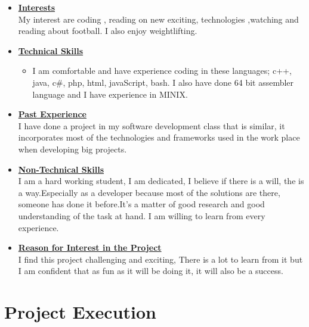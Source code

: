 \documentclass[a4paper,12pt]{article}
\begin{document}
\begin{itemize}
\item {\Large \underline{\textbf{Interests}}}\\[0.2cm]
My interest are coding , reading on new exciting, technologies ,watching and reading about football. I also enjoy weightlifting.


\item {\Large \underline{\textbf{Technical Skills}}}

	\begin{itemize}
		\item I am comfortable and have experience coding in these languages; c++, java, c\#, php, html, javaScript, bash. I also have done 64 bit assembler language and I have experience in MINIX.
	\end{itemize}
\bigskip
\item {\Large \underline{\textbf{Past Experience}}}\\[0.2cm]
I have done a project in my software development class that is similar, it incorporates  most of the technologies and frameworks used in the work place when developing big projects.
\\
\item {\Large \underline{\textbf{Non-Technical Skills}}}\\[0.2cm]
 I am a hard working student, I am dedicated, I believe if there is a will, the is a way.Especially as a developer because most of the solutions are there, someone has done it before.It's a matter of good research and good understanding of the task at hand. I am willing to learn from every experience. 
\\
\item {\Large \underline{\textbf{Reason for Interest in the Project}}}\\[0.2cm]
I find this project challenging and exciting, There is a lot to learn from it but I am confident that as fun as it will be doing it, it will also be a success.

\end{itemize}

\newpage
\section{Project Execution}
\end{document}

